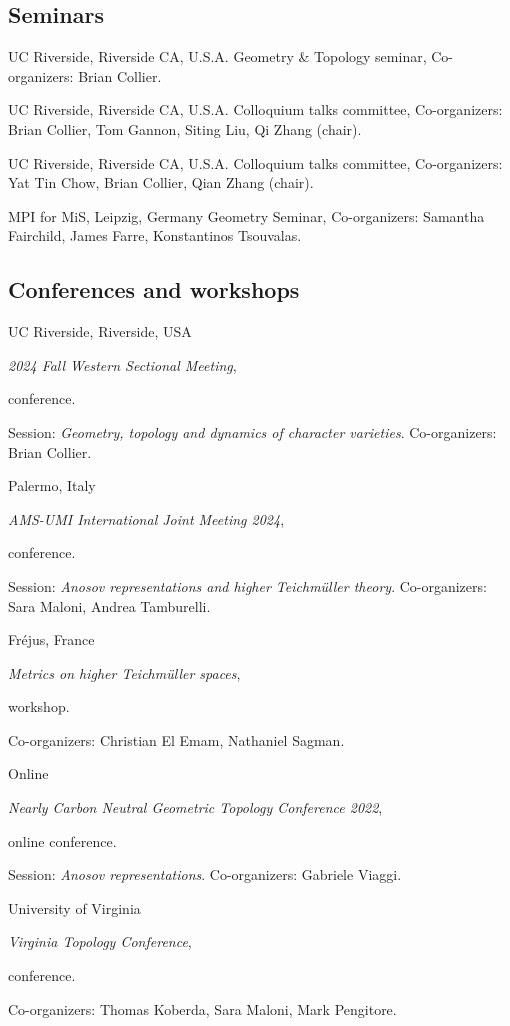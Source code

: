 
\subsection{Seminars}

{UC Riverside, Riverside CA, U.S.A.}
{Geometry \& Topology seminar,}
{Co-organizers: Brian Collier.}

{UC Riverside, Riverside CA, U.S.A.}
{Colloquium talks committee,}
{Co-organizers: Brian Collier, Tom Gannon, Siting Liu, Qi Zhang (chair).}

{UC Riverside, Riverside CA, U.S.A.}
{Colloquium talks committee,}
{Co-organizers: Yat Tin Chow, Brian Collier, Qian Zhang (chair).}

{MPI for MiS, Leipzig, Germany}
{Geometry Seminar,}
{Co-organizers: Samantha Fairchild, James Farre, Konstantinos Tsouvalas.}

\subsection{Conferences and workshops}

{UC Riverside, Riverside, USA}
{\emph{2024 Fall Western Sectional Meeting}, \begin{footnotesize}
		conference.
\end{footnotesize}}
{Session: \emph{Geometry, topology and dynamics of character varieties}. Co-organizers: Brian Collier.}

{Palermo, Italy}
{\emph{ AMS-UMI International Joint Meeting 2024}, \begin{footnotesize}
		conference.
\end{footnotesize}}
{Session: \emph{Anosov representations and higher Teichm\"uller theory}. Co-organizers: Sara Maloni, Andrea Tamburelli.}

{Fr\'ejus, France}
{\emph{Metrics on higher Teichm\"uller spaces}, \begin{footnotesize}
		workshop.
\end{footnotesize}}
{Co-organizers: Christian El Emam, Nathaniel Sagman.}

{Online}
{\emph{Nearly Carbon Neutral Geometric Topology Conference 2022}, \begin{footnotesize}
		online conference.
\end{footnotesize}}
{Session: \emph{Anosov representations}. Co-organizers: Gabriele Viaggi.}

{University of Virginia}
{\emph{Virginia Topology Conference}, \begin{footnotesize}
		conference.
\end{footnotesize}}
{Co-organizers: Thomas Koberda, Sara Maloni, Mark Pengitore.}
%